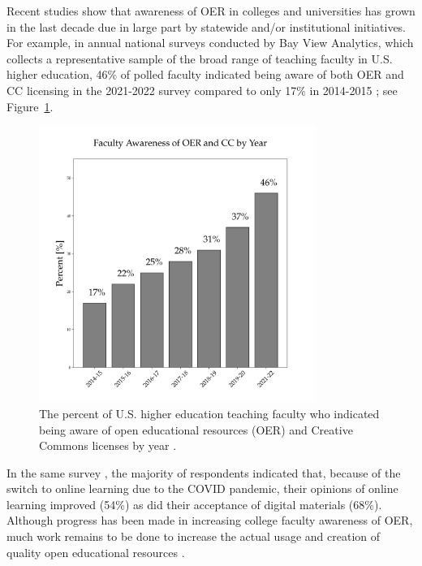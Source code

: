 \documentclass[11pt]{article}
\begin{document}
Recent studies show that awareness of OER in colleges and universities has grown in the last decade due in large part by statewide and/or institutional initiatives.  For example, in annual national surveys conducted by Bay View Analytics, which collects a representative sample of the broad range of teaching faculty in U.S. higher education, 46\% of polled faculty indicated being aware of both OER and CC licensing in the 2021-2022 survey compared to only 17\% in 2014-2015 \cite{JS-JS:2022}; see Figure~\ref{fig:oer-awareness}.
\begin{figure}
\centering
\includegraphics[width=90mm]{oer_awareness.png}
\caption{The percent of U.S. higher education teaching faculty who indicated being aware of open educational resources (OER) and Creative Commons licenses by year \cite{JS-JS:2022}.}
\label{fig:oer-awareness}
\end{figure}
In the same survey \cite{JS-JS:2022}, the majority of respondents indicated that, because of the switch to online learning due to the COVID pandemic, their opinions of online learning improved (54\%) as did their acceptance of digital materials (68\%).  Although progress has been made in increasing college faculty awareness of OER, much work remains to be done to increase the actual usage and creation of quality open educational resources \cite{flvc2022}.
\end{document}
